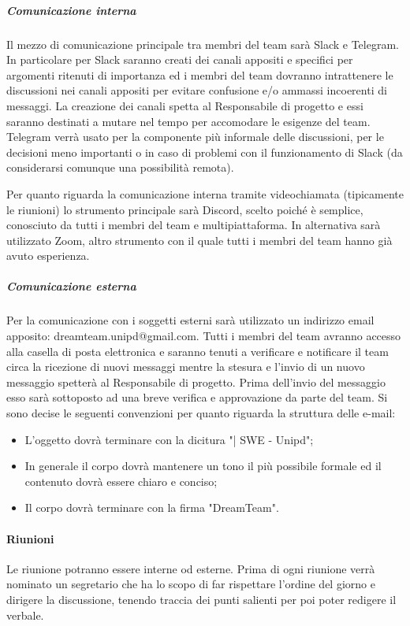 \subparagraph{Comunicazione interna}
Il mezzo di comunicazione principale tra membri del team sarà Slack e Telegram.
In particolare per Slack saranno creati dei canali appositi e specifici per argomenti ritenuti di importanza ed i membri del team dovranno intrattenere le discussioni nei canali appositi per evitare confusione e/o ammassi incoerenti di messaggi. La creazione dei canali spetta al Responsabile di progetto e essi saranno destinati a mutare nel tempo per accomodare le esigenze del team.
Telegram verrà usato per la componente più informale delle discussioni, per le decisioni meno importanti o in caso di problemi con il funzionamento di Slack (da considerarsi comunque una possibilità remota). 

Per quanto riguarda la comunicazione interna tramite videochiamata (tipicamente le riunioni) lo strumento principale sarà Discord, scelto poiché è semplice, conosciuto da tutti i membri del team e multipiattaforma. In alternativa sarà utilizzato Zoom, altro strumento con il quale tutti i membri del team hanno già avuto esperienza.

\subparagraph{Comunicazione esterna}
 Per la comunicazione con i soggetti esterni sarà utilizzato un indirizzo email apposito: dreamteam.unipd@gmail.com.
Tutti i membri del team avranno accesso alla casella di posta elettronica e saranno tenuti a verificare e notificare il team circa la ricezione di nuovi messaggi mentre la stesura e l'invio di un nuovo messaggio spetterà al Responsabile di progetto.
Prima dell'invio del messaggio esso sarà sottoposto ad una breve verifica e approvazione da parte del team.
Si sono decise le seguenti convenzioni per quanto riguarda la struttura delle e-mail:
\begin{itemize}
\item L'oggetto dovrà terminare con la dicitura "| SWE - Unipd";
\item In generale il corpo dovrà mantenere un tono il più possibile formale ed il contenuto dovrà essere chiaro e conciso;
\item Il corpo dovrà terminare con la firma "DreamTeam".
\end{itemize}

\paragraph{Riunioni}
Le riunione potranno essere interne od esterne. Prima di ogni riunione verrà nominato un segretario che ha lo scopo di far rispettare l'ordine del giorno e dirigere la discussione, tenendo traccia dei punti salienti per poi poter redigere il verbale.

